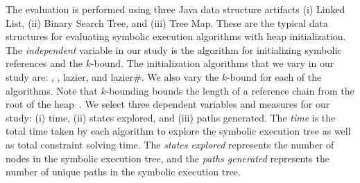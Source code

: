 The evaluation is performed using three Java data structure artifacts
(i) Linked List, (ii) Binary Search Tree, and (iii) Tree Map.  These
are the typical data structures for evaluating symbolic execution
algorithms with heap initialization. The \emph{independent} variable
in our study is the algorithm for initializing symbolic references and
the $k$-bound. The initialization algorithms that we vary in our study
are: \symtxt{}, \gsetxt{}, lazier, and lazier\#. We also vary the
$k$-bound for each of the algorithms. Note that $k$-bounding bounds
the length of a reference chain from the root of the
heap~\cite{Kiasan06}.  We select three dependent variables and
measures for our study: (i) time, (ii) states explored, and (iii)
paths generated. The \emph{time} is the total time taken by each
algorithm to explore the symbolic execution tree as well as total
constraint solving time. The \emph{states explored} represents the
number of nodes in the symbolic execution tree, and the \emph{paths
  generated} represents the number of unique paths in the symbolic
execution tree.


